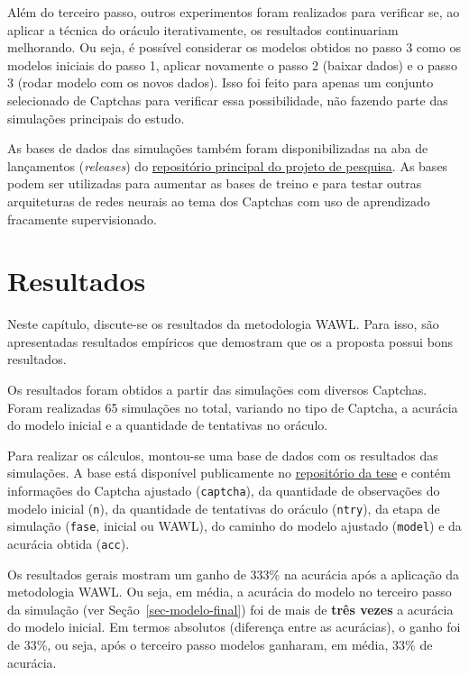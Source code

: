 \documentclass[12pt,twoside,brazilian]{book}
\begin{document}
Além do terceiro passo, outros experimentos foram realizados para
verificar se, ao aplicar a técnica do oráculo iterativamente, os
resultados continuariam melhorando. Ou seja, é possível considerar os
modelos obtidos no passo 3 como os modelos iniciais do passo 1, aplicar
novamente o passo 2 (baixar dados) e o passo 3 (rodar modelo com os
novos dados). Isso foi feito para apenas um conjunto selecionado de
Captchas para verificar essa possibilidade, não fazendo parte das
simulações principais do estudo.

As bases de dados das simulações também foram disponibilizadas na aba de
lançamentos (\emph{releases}) do
\href{https://github.com/jtrecenti/doutorado/releases}{repositório
principal do projeto de pesquisa}. As bases podem ser utilizadas para
aumentar as bases de treino e para testar outras arquiteturas de redes
neurais ao tema dos Captchas com uso de aprendizado fracamente
supervisionado.


\hypertarget{sec-results}{%
\chapter{Resultados}\label{sec-results}}


Neste capítulo, discute-se os resultados da metodologia WAWL. Para isso,
são apresentadas resultados empíricos que demostram que os a proposta
possui bons resultados.

Os resultados foram obtidos a partir das simulações com diversos
Captchas. Foram realizadas 65 simulações no total, variando no tipo de
Captcha, a acurácia do modelo inicial e a quantidade de tentativas no
oráculo.

Para realizar os cálculos, montou-se uma base de dados com os resultados
das simulações. A base está disponível publicamente no
\href{https://github.com/jtrecenti/doutorado}{repositório da tese} e
contém informações do Captcha ajustado (\texttt{captcha}), da quantidade
de observações do modelo inicial (\texttt{n}), da quantidade de
tentativas do oráculo (\texttt{ntry}), da etapa de simulação
(\texttt{fase}, inicial ou WAWL), do caminho do modelo ajustado
(\texttt{model}) e da acurácia obtida (\texttt{acc}).

Os resultados gerais mostram um ganho de 333\% na acurácia após a
aplicação da metodologia WAWL. Ou seja, em média, a acurácia do modelo
no terceiro passo da simulação (ver Seção~\ref{sec-modelo-final}) foi de
mais de \textbf{três vezes} a acurácia do modelo inicial. Em termos
absolutos (diferença entre as acurácias), o ganho foi de 33\%, ou seja,
após o terceiro passo modelos ganharam, em média, 33\% de acurácia.
\end{document}
